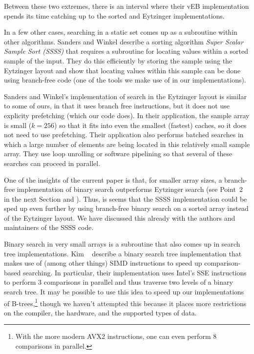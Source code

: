 \documentclass{patmorin}
\begin{document}
Between these two extremes, there is an interval where their vEB
implementation spends its time catching up to the sorted and Eytzinger
implementations.

In a few other cases, searching in a static set comes up as a subroutine
within other algorithms.  Sanders and Winkel \cite{sanders.winkel:super}
describe a sorting algorithm \emph{Super Scalar Sample Sort (SSSS)}
that requires a subroutine for locating values within a sorted sample
of the input.  They do this efficiently by storing the sample using
the Eytzinger layout and show that locating values within this sample
can be done using branch-free code (one of the tools we make use of in
our implementations).

Sanders and Winkel's implementation of search in the Eytzinger layout is
similar to some of ours, in that it uses branch free instructions, but
it does not use explicity prefetching (which our code does).  In their
application, the sample array is small ($k=256$) so that it fits into even
the smallest (fastest) caches, so it does not need to use prefetching.
Their application also performs batched searches in which a large number
of elements are being located in this relatively small sample array.
They use loop unrolling or software pipelining so that several of these
searches can proceed in parallel. 

One of the insights of the current paper  is that, for smaller array
sizes, a branch-free implementation of binary search outperforms Eytzinger
search (see Point~2 in the next Section and ).
Thus, is seems that the SSSS implementation could be sped up even further
by using branch-free binary search on a sorted array instead of the
Eytzinger layout.  We have discussed this already with the authors and
maintainers of the SSSS code.

Binary search in very small arrays is a subroutine that also comes up
in search tree implementations.  Kim \etal\ \cite{kim.chhugani.ea:fast}
describe a binary search tree implementation that makes use of (among
other things) SIMD instructions to speed up comparison-based searching. In
particular, their implementation uses Intel's SSE instructions to
perform 3 comparisons in parallel and thus traverse two levels of a
binary search tree.  It may be possible to use this idea to speed up
our implementations of B-trees,\footnote{With the more modern AVX2
instructions, one can even perform 8 comparisons in parallel.} though
we haven't attempted this because it places more restrictions on the
compiler, the hardware, and the supported types of data.
\end{document}
